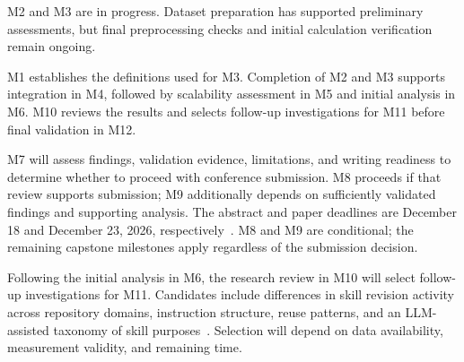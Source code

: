 M2 and M3 are in progress. Dataset preparation has supported preliminary assessments, but final preprocessing checks and initial calculation verification remain ongoing.

M1 establishes the definitions used for M3. Completion of M2 and M3 supports integration in M4, followed by scalability assessment in M5 and initial analysis in M6. M10 reviews the results and selects follow-up investigations for M11 before final validation in M12.

M7 will assess findings, validation evidence, limitations, and writing readiness to determine whether to proceed with conference submission. M8 proceeds if that review supports submission; M9 additionally depends on sufficiently validated findings and supporting analysis. The abstract and paper deadlines are December 18 and December 23, 2026, respectively~\cite{msr2027MiningChallenge}. M8 and M9 are conditional; the remaining capstone milestones apply regardless of the submission decision.

\label{sec:contingencies}

Following the initial analysis in M6, the research review in M10 will select follow-up investigations for M11. Candidates include differences in skill revision activity across repository domains, instruction structure, reuse patterns, and an LLM-assisted taxonomy of skill purposes~\cite{wan2024tnt}. Selection will depend on data availability, measurement validity, and remaining time.

